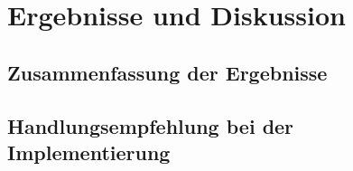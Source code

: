 \newpage
\section{Ergebnisse und Diskussion}
\subsection{Zusammenfassung der Ergebnisse}
\subsection{Handlungsempfehlung bei der Implementierung}